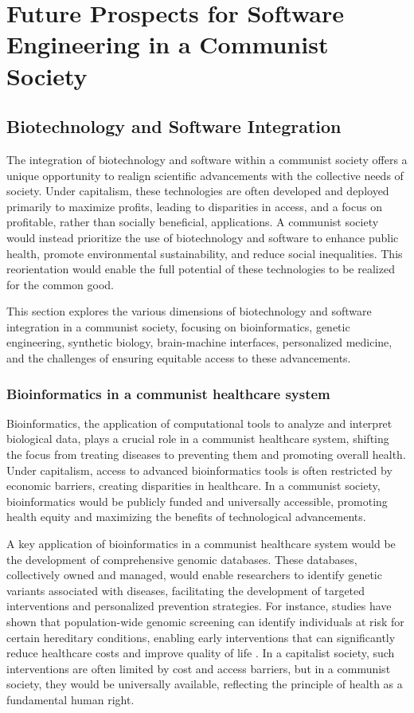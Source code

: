 \chapter{Future Prospects for Software Engineering in a Communist Society}

\section{Biotechnology and Software Integration}

The integration of biotechnology and software within a communist society offers a unique opportunity to realign scientific advancements with the collective needs of society. Under capitalism, these technologies are often developed and deployed primarily to maximize profits, leading to disparities in access, and a focus on profitable, rather than socially beneficial, applications. A communist society would instead prioritize the use of biotechnology and software to enhance public health, promote environmental sustainability, and reduce social inequalities. This reorientation would enable the full potential of these technologies to be realized for the common good.

This section explores the various dimensions of biotechnology and software integration in a communist society, focusing on bioinformatics, genetic engineering, synthetic biology, brain-machine interfaces, personalized medicine, and the challenges of ensuring equitable access to these advancements.

\subsection{Bioinformatics in a communist healthcare system}

Bioinformatics, the application of computational tools to analyze and interpret biological data, plays a crucial role in a communist healthcare system, shifting the focus from treating diseases to preventing them and promoting overall health. Under capitalism, access to advanced bioinformatics tools is often restricted by economic barriers, creating disparities in healthcare. In a communist society, bioinformatics would be publicly funded and universally accessible, promoting health equity and maximizing the benefits of technological advancements.

A key application of bioinformatics in a communist healthcare system would be the development of comprehensive genomic databases. These databases, collectively owned and managed, would enable researchers to identify genetic variants associated with diseases, facilitating the development of targeted interventions and personalized prevention strategies. For instance, studies have shown that population-wide genomic screening can identify individuals at risk for certain hereditary conditions, enabling early interventions that can significantly reduce healthcare costs and improve quality of life \cite[pp.~112-118]{johnson2019genomics}. In a capitalist society, such interventions are often limited by cost and access barriers, but in a communist society, they would be universally available, reflecting the principle of health as a fundamental human right.

